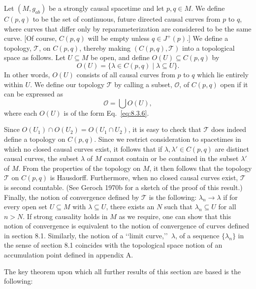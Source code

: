 Let \((M,g_{ab})\) be a strongly causal spacetime and let \(p,q\in M\). We define
\(C(p,q)\) to be the set of continuous, future directed causal curves from \(p\) to
\(q\), where curves that differ only by reparameterization are considered to be the
same curve. [Of course, \(C(p,q)\) will be empty unless \(q\in J^+(p)\).] We define a
topology, \(\mathcal T\), on \(C(p,q)\), thereby making \((C(p,q),\mathcal T)\) into a
topological space as follows. Let \(U\subseteq M\) be open, and define
\(O(U)\subseteq C(p,q)\) by
\begin{equation}
  O(U)=\{\lambda\in C(p,q)\mid\lambda\subseteq U\}.
  \tag{8.3.6}\label{eq:8.3.6}
\end{equation}
In other words, \(O(U)\) consists of all causal curves from \(p\) to \(q\) which lie
entirely within \(U\). We define our topology \(\mathcal T\) by calling a subset,
\(\mathcal O\), of \(C(p,q)\) open if it can be expressed as
\begin{equation}
  \mathcal O=\bigcup O(U),
  \tag{8.3.7}\label{eq:8.3.7}
\end{equation}
where each \(O(U)\) is of the form Eq.~\eqref{eq:8.3.6}.

Since \(O(U_1)\cap O(U_2)=O(U_1\cap U_2)\), it is easy to check that \(\mathcal T\)
does indeed define a topology on \(C(p,q)\). Since we restrict consideration to
spacetimes in which no closed causal curves exist, it follows that if
\(\lambda,\lambda'\in C(p,q)\) are distinct causal curves, the subset \(\lambda\) of
\(M\) cannot contain or be contained in the subset \(\lambda'\) of \(M\). From the
properties of the topology on \(M\), it then follows that the topology \(\mathcal T\)
on \(C(p,q)\) is Hausdorff. Furthermore, when no closed causal curves exist,
\(\mathcal T\) is second countable. (See Geroch 1970b for a sketch of the proof of
this result.) Finally, the notion of convergence defined by \(\mathcal T\) is the
following: \(\lambda_n\to\lambda\) if for every open set \(U\subseteq M\) with
\(\lambda\subseteq U\), there exists an \(N\) such that \(\lambda_n\subseteq U\) for
all \(n>N\). If strong causality holds in \(M\) as we require, one can show that this
notion of convergence is equivalent to the notion of convergence of curves defined
in section 8.1. Similarly, the notion of a \lq\lq limit curve,\rq\rq\ \(\lambda\), of a
sequence \(\{\lambda_n\}\) in the sense of section 8.1 coincides with the topological
space notion of an accumulation point defined in appendix A.

The key theorem upon which all further results of this section are based is the
following:

